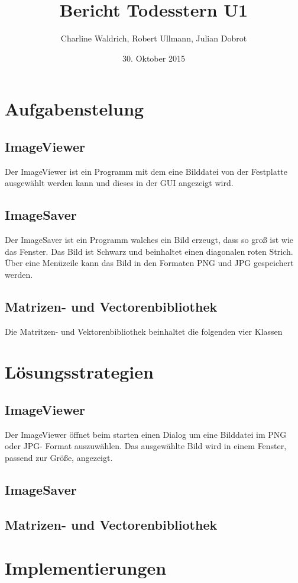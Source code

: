 \documentclass[a4paper,10pt]{ltxdoc}
\title{Bericht Todesstern U1}
\author{Charline Waldrich, Robert Ullmann, Julian Dobrot}
\date{30. Oktober 2015}
\begin{document}
\maketitle
\tableofcontents
\pagebreak

\section{Aufgabenstelung}

\subsection{ImageViewer}
Der ImageViewer ist ein Programm mit dem eine Bilddatei von der Festplatte ausgewählt werden kann und dieses in der GUI angezeigt wird. 
\subsection{ImageSaver}
Der ImageSaver ist ein Programm walches ein Bild erzeugt, dass so groß ist wie das Fenster.
Das Bild ist Schwarz und beinhaltet einen diagonalen roten Strich. Über eine Menüzeile kann das Bild in den Formaten PNG und JPG gespeichert werden.
\subsection{Matrizen- und Vectorenbibliothek}
Die Matritzen- und Vektorenbibliothek beinhaltet die folgenden vier Klassen 

\section{Lösungsstrategien}
\subsection{ImageViewer}
Der ImageViewer öffnet beim starten einen Dialog um eine Bilddatei im PNG oder JPG- Format auszuwählen. Das ausgewählte Bild wird in einem Fenster, passend zur Größe, angezeigt.
\subsection{ImageSaver}

\subsection{Matrizen- und Vectorenbibliothek}

\section{Implementierungen}
\end{document}
